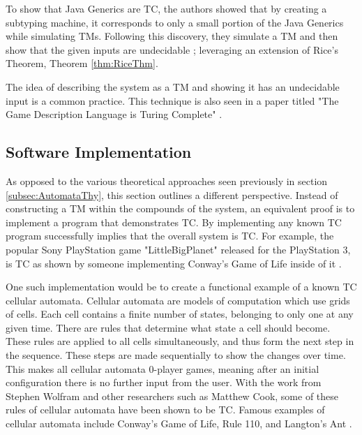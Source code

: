To show that Java Generics are TC, the authors showed that by creating a subtyping machine, it corresponds to only a small portion of the Java Generics while simulating TMs.
Following this discovery, they simulate a TM and then show that the given inputs are undecidable \cite{JavaGenericsTC}; leveraging an extension of Rice's Theorem, Theorem \ref{thm:RiceThm}.

The idea of describing the system as a TM and showing it has an undecidable input is a common practice.
This technique is also seen in a paper titled "The Game Description Language is Turing Complete" \cite{GDLTC}.

\subsection{Software Implementation}\label{subsec:SoftwareImplementation}

As opposed to the various theoretical approaches seen previously in section \ref{subsec:AutomataThy}, this section outlines a different perspective.
Instead of constructing a TM within the compounds of the system, an equivalent proof is to implement a program that demonstrates TC.
By implementing any known TC program successfully implies that the overall system is TC.
For example, the popular Sony PlayStation game "LittleBigPlanet" released for the PlayStation 3, is TC as shown by someone implementing Conway's Game of Life inside of it \cite{LittleBigCGoL}.

One such implementation would be to create a functional example of a known TC cellular automata.
Cellular automata are models of computation which use grids of cells.
Each cell contains a finite number of states, belonging to only one at any given time.
There are rules that determine what state a cell should become.
These rules are applied to all cells simultaneously, and thus form the next step in the sequence.
These steps are made sequentially to show the changes over time.
This makes all cellular automata 0-player games, meaning after an initial configuration there is no further input from the user.
With the work from Stephen Wolfram and other researchers such as Matthew Cook, some of these rules of cellular automata have been shown to be TC.
Famous examples of cellular automata include Conway's Game of Life, Rule 110, and Langton's Ant \cite{CellAutWiki,CellAutWolfram,CGolTM,AntyParticles,AntWiki}.


